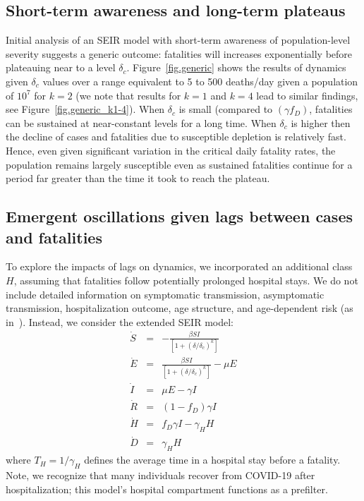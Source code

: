 \subsection{Short-term awareness and long-term plateaus}
Initial analysis of an SEIR model with short-term 
awareness of population-level severity suggests a generic outcome: 
fatalities will increases
exponentially before plateauing near to a level $\delta_c$.
Figure~\ref{fig.generic} shows
the results of dynamics given $\delta_c$ values over a range 
equivalent to 5 to 500 deaths/day given a population of $10^7$
for $k=2$ (we note that results for $k=1$ and $k=4$ lead to similar
findings, see Figure~\ref{fig.generic_k1-4}).
When $\delta_c$ is small (compared to $(\gamma f_D)$,
fatalities can be sustained at near-constant levels for a long time.
When $\delta_c$ is higher then the decline of cases and fatalities due to susceptible depletion is relatively fast.
Hence, even given significant variation
in the critical daily fatality rates,
the population remains largely susceptible even as
sustained fatalities continue for a period far greater than
the time it took to reach the plateau.

\subsection{Emergent oscillations given lags between cases and fatalities}
To explore the impacts of lags on dynamics,
we incorporated an additional class $H$,
assuming that fatalities follow potentially prolonged
hospital stays.  We do not include 
detailed information on symptomatic transmission, asymptomatic
transmission, hospitalization outcome,
age structure, and age-dependent risk (as in~\citep{ferguson2020report}). 
Instead, we consider the extended SEIR model:
\begin{eqnarray}
\dot{S} &=& -\frac{\beta SI}{\left[1+\left(\delta/\delta_c\right)^{k}\right]}\\
\dot{E} &=& \frac{\beta SI}{\left[1+\left(\delta/\delta_c\right)^{k}\right]}-\mu E\\
\dot{I} &=& \mu E-\gamma I \\
\dot{R} &=& (1-f_D)\gamma I\\
\dot{H} &=& f_D\gamma I - \gamma_H H\\
\dot{D} &=& \gamma_H H
\end{eqnarray}
where $T_H=1/\gamma_H$ defines the average time in a hospital
stay before a fatality. Note, we recognize that many individuals
recover from COVID-19 after hospitalization; this model's hospital
compartment functions as a prefilter.  

